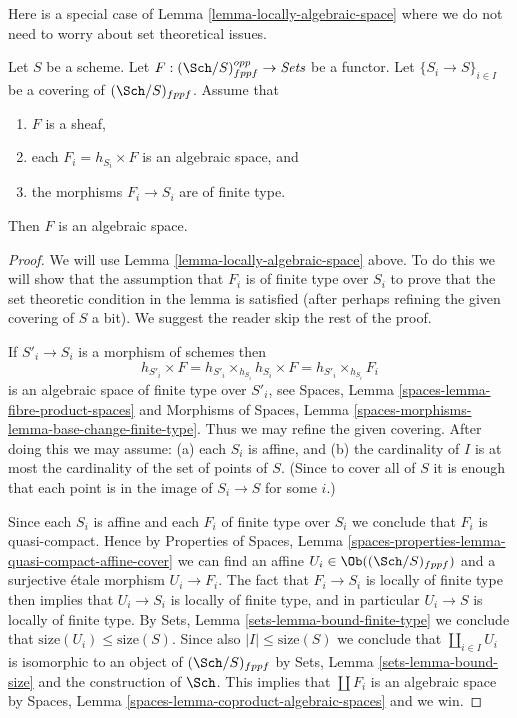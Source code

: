 \noindent
Here is a special case of Lemma \ref{lemma-locally-algebraic-space}
where we do not need to worry about set theoretical issues.

\begin{lemma}
\label{lemma-locally-algebraic-space-finite-type}
Let $S$ be a scheme.
Let $F : (\Sch/S)_{fppf}^{opp} \to \textit{Sets}$ be a functor.
Let $\{S_i \to S\}_{i \in I}$ be a covering of $(\Sch/S)_{fppf}$.
Assume that
\begin{enumerate}
\item $F$ is a sheaf,
\item each $F_i = h_{S_i} \times F$ is an algebraic space, and
\item the morphisms $F_i \to S_i$ are of finite type.
\end{enumerate}
Then $F$ is an algebraic space.
\end{lemma}

\begin{proof}
We will use
Lemma \ref{lemma-locally-algebraic-space}
above. To do this we will show that the assumption that
$F_i$ is of finite type over $S_i$ to prove that the set theoretic
condition in the lemma is satisfied (after perhaps refining the given
covering of $S$ a bit).
We suggest the reader skip the rest of the proof.

\medskip\noindent
If $S'_i \to S_i$ is a morphism of schemes then
$$
h_{S'_i} \times F =
h_{S'_i} \times_{h_{S_i}} h_{S_i} \times F =
h_{S'_i} \times_{h_{S_i}} F_i
$$
is an algebraic space of finite type over $S'_i$, see
Spaces, Lemma \ref{spaces-lemma-fibre-product-spaces}
and
Morphisms of Spaces,
Lemma \ref{spaces-morphisms-lemma-base-change-finite-type}.
Thus we may refine the given covering. After doing this we may assume:
(a) each $S_i$ is affine, and (b) the cardinality of $I$ is at most
the cardinality of the set of points of $S$. (Since to cover
all of $S$ it is enough that each point is in the image of $S_i \to S$
for some $i$.)

\medskip\noindent
Since each $S_i$ is affine and each $F_i$ of finite type over $S_i$
we conclude that $F_i$ is quasi-compact. Hence by
Properties of Spaces,
Lemma \ref{spaces-properties-lemma-quasi-compact-affine-cover}
we can find an affine $U_i \in \Ob((\Sch/S)_{fppf})$
and a surjective \'etale morphism $U_i \to F_i$. The fact that
$F_i \to S_i$ is locally of finite type then implies that
$U_i \to S_i$ is locally of finite type, and in particular
$U_i \to S$ is locally of finite type. By
Sets, Lemma \ref{sets-lemma-bound-finite-type}
we conclude that $\text{size}(U_i) \leq \text{size}(S)$.
Since also $|I| \leq \text{size}(S)$ we conclude that
$\coprod_{i \in I} U_i$ is isomorphic to an object of
$(\Sch/S)_{fppf}$ by
Sets, Lemma \ref{sets-lemma-bound-size}
and the construction of $\Sch$. This implies that
$\coprod F_i$ is an algebraic space by
Spaces, Lemma \ref{spaces-lemma-coproduct-algebraic-spaces}
and we win.
\end{proof}

